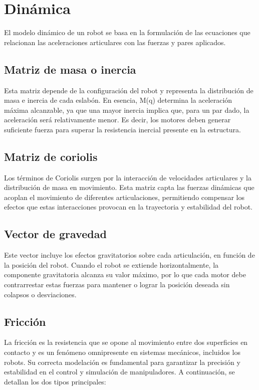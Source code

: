 \section{Dinámica} \label{sec:dinamica}

El modelo dinámico de un robot se basa en la formulación de las ecuaciones que relacionan las aceleraciones articulares con las fuerzas y pares aplicados.
\subsection{Matriz de masa o inercia}
Esta matriz depende de la configuración del robot y representa la distribución de masa e inercia de cada eslabón. En esencia, M(q) determina la aceleración máxima alcanzable, ya que una mayor inercia implica que, para un par dado, la aceleración será relativamente menor. Es decir, los motores deben generar suficiente fuerza para superar la resistencia inercial presente en la estructura.

\subsection{Matriz de coriolis}
Los términos de Coriolis surgen por la interacción de velocidades articulares y la distribución de masa en movimiento. Esta matriz capta las fuerzas dinámicas que acoplan el movimiento de diferentes articulaciones, permitiendo compensar los efectos que estas interacciones provocan en la trayectoria y estabilidad del robot.

\subsection{Vector de gravedad}
Este vector incluye los efectos gravitatorios sobre cada articulación, en función de la posición del robot. Cuando el robot se extiende horizontalmente, la componente gravitatoria alcanza su valor máximo, por lo que cada motor debe contrarrestar estas fuerzas para mantener o lograr la posición deseada sin colapsos o desviaciones.

\subsection{Fricción}
La fricción es la resistencia que se opone al movimiento entre dos superficies en contacto y es un fenómeno omnipresente en sistemas mecánicos, incluidos los robots. Su correcta modelación es fundamental para garantizar la precisión y estabilidad en el control y simulación de manipuladores. A continuación, se detallan los dos tipos principales:

